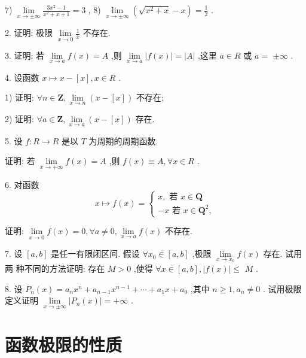 7) $\mathop{\lim }\limits_{{x \rightarrow   \pm  \infty }}\frac{3{x}^{2} - 1}{{x}^{2} + x + 1} = 3$ , 8) $\mathop{\lim }\limits_{{x \rightarrow   \pm  \infty }}\left( {\sqrt{{x}^{2} + x} - x}\right)  = \frac{1}{2}$ .

2. 证明: 极限 $\mathop{\lim }\limits_{{x \rightarrow  0}}\frac{1}{x}$ 不存在.

3. 证明: 若 $\mathop{\lim }\limits_{{x \rightarrow  a}}f\left( x\right)  = A$ ,则 $\mathop{\lim }\limits_{{x \rightarrow  a}}\left| {f\left( x\right) }\right|  = \left| A\right|$ ,这里 $a \in  R$ 或 $a =$  $\pm  \infty$ .

4. 设函数 $x \mapsto  x - \left\lbrack  x\right\rbrack  ,x \in  R$ .

1) 证明: $\forall n \in  \mathbf{Z},\mathop{\lim }\limits_{{x \rightarrow  n}}\left( {x - \left\lbrack  x\right\rbrack  }\right)$ 不存在;

2) 证明: $\forall a \in  \mathbf{Z},\mathop{\lim }\limits_{{x \rightarrow  a}}\left( {x - \left\lbrack  x\right\rbrack  }\right)$ 存在.

5. 设 $f : R \rightarrow  R$ 是以 $T$ 为周期的周期函数.

证明: 若 $\mathop{\lim }\limits_{{x \rightarrow   + \infty }}f\left( x\right)  = A$ ,则 $f\left( x\right)  \equiv  A,\forall x \in  R$ .

6. 对函数
$$x \mapsto  f\left( x\right)  = \left\{  \begin{array}{l} x,\text{ 若 }x \in  \mathbf{Q} \\   - x\text{ 若 }x \in  {\mathbf{Q}}^{2}, \end{array}\right.$$

证明: $\mathop{\lim }\limits_{{x \rightarrow  0}}f\left( x\right)  = 0,\forall a \neq  0,\mathop{\lim }\limits_{{x \rightarrow  a}}f\left( x\right)$ 不存在.

7. 设 $\left\lbrack  {a,b}\right\rbrack$ 是任一有限闭区间. 假设 $\forall {x}_{0} \in  \left\lbrack  {a,b}\right\rbrack$ ,极限 $\mathop{\lim }\limits_{{x \rightarrow  {x}_{0}}}f\left( x\right)$ 存在. 试用两 种不同的方法证明: 存在 $M > 0$ ,使得 $\forall x \in  \left\lbrack  {a,b}\right\rbrack  ,\left| {f\left( x\right) }\right|  \leq$  $M$ .

8. 设 ${P}_{n}\left( x\right)  = {a}_{n}{x}^{n} + {a}_{n - 1}{x}^{n - 1} + \cdots  + {a}_{1}x + {a}_{0}$ ,其中 $n \geq  1,{a}_{n} \neq  0$ . 试用极限定义证明 $\mathop{\lim }\limits_{{x \rightarrow   \pm  \infty }}\left| {{P}_{n}\left( x\right) }\right|  =  + \infty$ .

\section{函数极限的性质}


